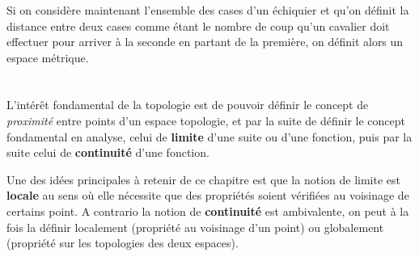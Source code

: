 \begin{center}
\end{center}
\subsection*{}
Si on considère maintenant l'ensemble des cases d'un échiquier et qu'on définit la distance entre deux cases comme étant le nombre de coup qu'un cavalier doit effectuer pour arriver à la seconde en partant de la première, on définit alors un espace métrique.

\chapter*{}
L'intérêt fondamental de la topologie est de pouvoir définir le concept de \textit{proximité} entre points d'un espace topologie, et par la suite de définir le concept fondamental en analyse, celui de \textbf{limite} d'une suite ou d'une fonction, puis par la suite celui de \textbf{continuité} d'une fonction.\<

Une des idées principales à retenir de ce chapitre est que la notion de limite est \textbf{locale} au sens où elle nécessite que des propriétés soient vérifiées au voisinage de certains point. A contrario la notion de \textbf{continuité} est ambivalente, on peut à la fois la définir localement (propriété au voisinage d'un point) ou globalement (propriété sur les topologies des deux espaces).\<

